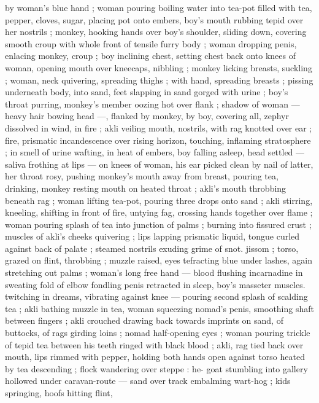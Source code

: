 by woman's blue hand ; woman pouring boiling water into tea-pot 
filled with tea, pepper, cloves, sugar, placing pot onto embers, boy's 
mouth rubbing tepid over her nostrils ; monkey, hooking hands over 
boy's shoulder, sliding down, covering smooth croup with whole front 
of tensile furry body ; woman dropping penis, enlacing monkey, 
croup ; boy inclining chest, setting chest back onto knees of woman, 
opening mouth over kneecaps, nibbling ; monkey licking breasts, 
suckling ; woman, neck quivering, spreading thighs ; with hand, 
spreading breasts ; pissing underneath body, into sand, feet 
slapping in sand gorged with urine ; boy's throat purring, monkey's 
member oozing hot over flank ; shadow of woman --- heavy hair 
bowing head ---, flanked by monkey, by boy, covering all, zephyr 
dissolved in wind, in fire ; akli veiling mouth, nostrils, with rag 
knotted over ear ; fire, prismatic incandescence over rising horizon, 
touching, inflaming stratosphere ; in smell of urine wafting, in heat 
of embers, boy falling asleep, head settled --- saliva frothing at lips 
--- on knees of woman, his ear picked clean by nail of latter, her 
throat rosy, pushing monkey's mouth away from breast, pouring tea, 
drinking, monkey resting mouth on heated throat ; akli's mouth 
throbbing beneath rag ; woman lifting tea-pot, pouring three drops 
onto sand ; akli stirring, kneeling, shifting in front of fire, untying 
fag, crossing hands together over flame ; woman pouring splash of 
tea into junction of palms ; burning into fissured crust ; muscles of 
akli's cheeks quivering ; lips lapping prismatic liquid, tongue curled 
against back of palate ; steamed nostrils exuding grime of snot. 
jissom ; torso, grazed on flint, throbbing ; muzzle raised, eyes 
tefracting blue under lashes, again stretching out palms ; woman's 
long free hand --- blood flushing incarnadine in sweating fold of 
elbow fondling penis retracted in sleep, boy's masseter muscles. 
twitching in dreams, vibrating against knee --- pouring second splash 
of scalding tea ; akli bathing muzzle in tea, woman squeezing 
nomad's penis, smoothing shaft between fingers ; akli crouched 
drawing back towards imprints on sand, of buttocks, of rags girding 
loins ; nomad half-opening eyes ; woman pouring trickle of tepid tea 
between his teeth ringed with black blood ; akli, rag tied back over 
mouth, lips rimmed with pepper, holding both hands open against 
torso heated by tea descending ; flock wandering over steppe : he- 
goat stumbling into gallery hollowed under caravan-route --- sand 
over track embalming wart-hog ; kids springing, hoofs hitting flint, 
